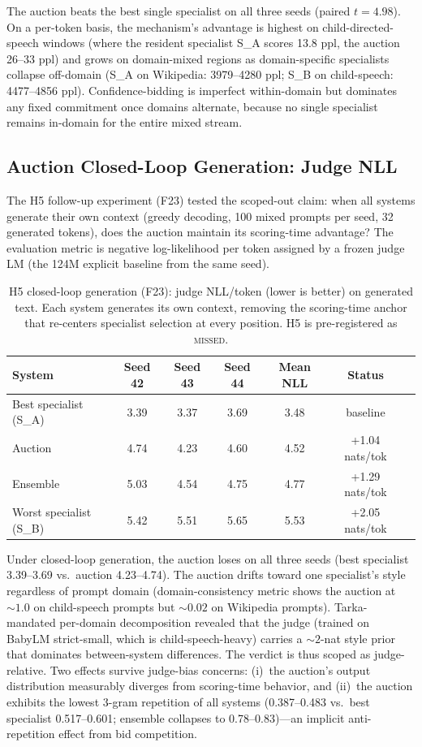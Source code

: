 The auction beats the best single specialist on all three seeds (paired $t = 4.98$). On a per-token basis, the mechanism's advantage is highest on child-directed-speech windows (where the resident specialist S\_A scores 13.8 ppl, the auction 26--33 ppl) and grows on domain-mixed regions as domain-specific specialists collapse off-domain (S\_A on Wikipedia: 3979--4280 ppl; S\_B on child-speech: 4477--4856 ppl). Confidence-bidding is imperfect within-domain but dominates any fixed commitment once domains alternate, because no single specialist remains in-domain for the entire mixed stream.

\subsection{Auction Closed-Loop Generation: Judge NLL}

The H5 follow-up experiment (F23) tested the scoped-out claim: when all systems generate their own context (greedy decoding, 100 mixed prompts per seed, 32 generated tokens), does the auction maintain its scoring-time advantage? The evaluation metric is negative log-likelihood per token assigned by a frozen judge LM (the 124M explicit baseline from the same seed).

\begin{table}[h]
\centering
\small
\caption{H5 closed-loop generation (F23): judge NLL/token (lower is better) on generated text. Each system generates its own context, removing the scoring-time anchor that re-centers specialist selection at every position. H5 is pre-registered as \textsc{missed}.}
\label{tab:auction_closedloop}
\begin{tabular}{@{}lcccccc@{}}
\toprule
System & Seed 42 & Seed 43 & Seed 44 & Mean NLL & Status \\
\midrule
Best specialist (S\_A) & 3.39 & 3.37 & 3.69 & 3.48 & baseline \\
Auction & 4.74 & 4.23 & 4.60 & 4.52 & +1.04 nats/tok \\
Ensemble & 5.03 & 4.54 & 4.75 & 4.77 & +1.29 nats/tok \\
Worst specialist (S\_B) & 5.42 & 5.51 & 5.65 & 5.53 & +2.05 nats/tok \\
\bottomrule
\end{tabular}
\end{table}

Under closed-loop generation, the auction loses on all three seeds (best specialist 3.39--3.69 vs.\ auction 4.23--4.74). The auction drifts toward one specialist's style regardless of prompt domain (domain-consistency metric shows the auction at $\sim 1.0$ on child-speech prompts but $\sim 0.02$ on Wikipedia prompts). Tarka-mandated per-domain decomposition revealed that the judge (trained on BabyLM strict-small, which is child-speech-heavy) carries a $\sim 2$-nat style prior that dominates between-system differences. The verdict is thus scoped as judge-relative. Two effects survive judge-bias concerns: (i)~the auction's output distribution measurably diverges from scoring-time behavior, and (ii)~the auction exhibits the lowest 3-gram repetition of all systems (0.387--0.483 vs.\ best specialist 0.517--0.601; ensemble collapses to 0.78--0.83)---an implicit anti-repetition effect from bid competition.

